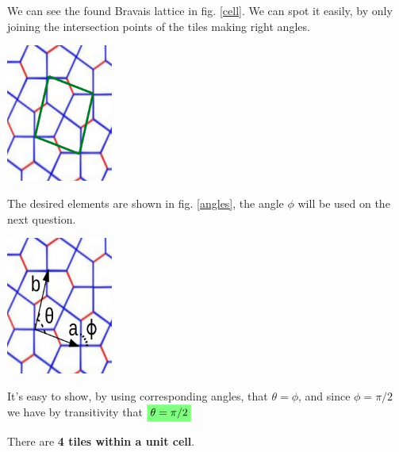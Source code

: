 \begin{questions}
\begin{solution} We can see the found Bravais lattice in fig. \ref{cell}. We can spot it easily, by only joining the intersection points of the tiles making right angles.

  \begin{center}
    \includegraphics[width=35mm]{cairo_cell}
  \end{center}

  \label{cell}\vspace{0.5cm}

\end{solution}

\begin{solution}
  The desired elements are shown in fig. \ref{angles}, the angle $\phi$ will be used on the next question.

  \begin{center}
    \includegraphics[width=35mm]{angles}
  \end{center}

  \label{angles}\vspace{0.5cm}
\end{solution}

\begin{solution}
  It's easy to show, by using corresponding angles, that $\theta = \phi$, and since $\phi = \pi/2$ we have by transitivity that $\hlgreen{\theta = \pi/2}$
\end{solution}

\begin{solution}
  There are \textbf{4 tiles within a unit cell}.
\end{solution}
\end{questions}

%
%
